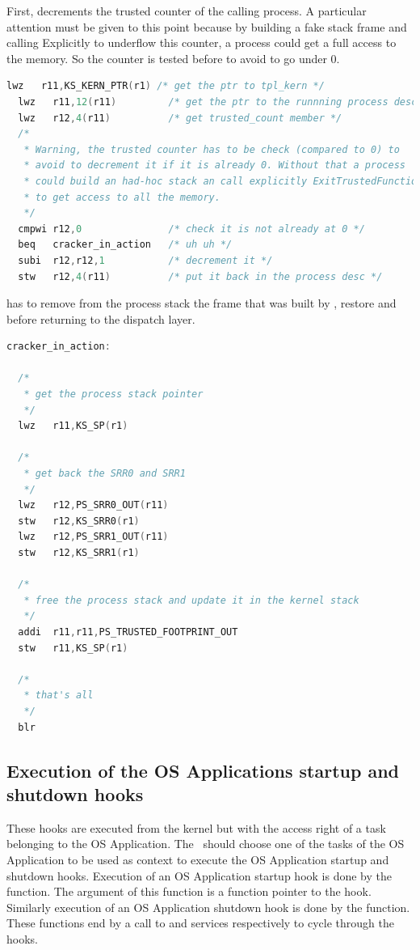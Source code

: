 First,  decrements the trusted counter of the calling process. A particular attention must be given to this point because by building a fake stack frame and calling Explicitly  to underflow this counter, a process could get a full access to the memory. So the counter is tested before to avoid to go under 0.

\begin{lstlisting}[language=C]
  lwz   r11,KS_KERN_PTR(r1) /* get the ptr to tpl_kern */
  lwz   r11,12(r11)         /* get the ptr to the runnning process desc */
  lwz   r12,4(r11)          /* get trusted_count member */
  /*
   * Warning, the trusted counter has to be check (compared to 0) to
   * avoid to decrement it if it is already 0. Without that a process
   * could build an had-hoc stack an call explicitly ExitTrustedFunction
   * to get access to all the memory.
   */
  cmpwi r12,0               /* check it is not already at 0 */
  beq   cracker_in_action   /* uh uh */
  subi  r12,r12,1           /* decrement it */
  stw   r12,4(r11)          /* put it back in the process desc */
\end{lstlisting}

 has to remove from the process stack the frame that was built by , restore  and  before returning to the dispatch layer.

\begin{lstlisting}[language=C]
cracker_in_action:
  
  /*
   * get the process stack pointer
   */
  lwz   r11,KS_SP(r1)
  
  /*
   * get back the SRR0 and SRR1
   */
  lwz   r12,PS_SRR0_OUT(r11)
  stw   r12,KS_SRR0(r1)
  lwz   r12,PS_SRR1_OUT(r11)
  stw   r12,KS_SRR1(r1)
  
  /*
   * free the process stack and update it in the kernel stack
   */
  addi  r11,r11,PS_TRUSTED_FOOTPRINT_OUT
  stw   r11,KS_SP(r1)
  
  /*
   * that's all
   */
  blr
\end{lstlisting}

\subsection{Execution of the OS Applications startup and shutdown hooks}

These hooks are executed from the kernel but with the access right of a task belonging to the OS Application. The \sysgen\ should choose one of the tasks of the OS Application to be used as context to execute the OS Application startup and shutdown hooks. Execution of an OS Application startup hook is done by the  function. The argument of this function is a function pointer to the hook. Similarly execution of an OS Application shutdown hook is done by the  function. These functions end by a call to  and  services respectively to cycle through the hooks.

